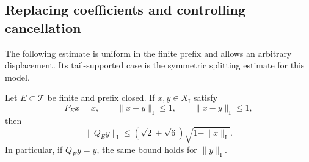 \subsection{Replacing coefficients and controlling cancellation}

The following estimate is uniform in the finite prefix and allows an
arbitrary displacement.  Its tail-supported case is the symmetric
splitting estimate for this model.

\begin{theorem}\label{sm:i:tail-estimate}
Let $E\subset\mathcal T$ be finite and prefix closed.  If
$x,y\in X_{\mathrm I}$ satisfy
\[
 P_E x=x,\qquad \|x+y\|_{\mathrm I}\leq1,
 \qquad \|x-y\|_{\mathrm I}\leq1,
\]
then
\begin{equation}
 \|Q_Ey\|_{\mathrm I}
 \leq (\sqrt2+\sqrt6)\sqrt{1-\|x\|_{\mathrm I}}.
 \label{sm:i:tail-bound}
\end{equation}
In particular, if $Q_Ey=y$, the same bound holds for $\|y\|_{\mathrm I}$.
\end{theorem}

